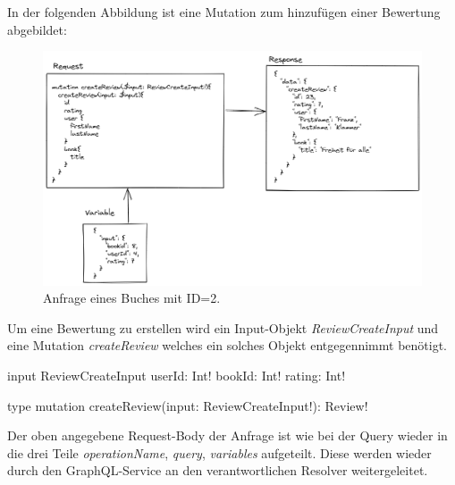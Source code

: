 In der folgenden Abbildung ist eine Mutation zum hinzufügen einer Bewertung abgebildet:

\begin{figure}[H]
    \includegraphics[width=\textwidth]{pics/createReviewMutation.png}
    \caption{Anfrage eines Buches mit ID=2.}
\end{figure}

Um eine Bewertung zu erstellen wird ein Input-Objekt \textit{ReviewCreateInput} und eine Mutation \textit{createReview} welches ein solches Objekt entgegennimmt benötigt.

\begin{JsCode}
input ReviewCreateInput {
    userId: Int!
    bookId: Int!
    rating: Int!
}

type mutation {
    createReview(input: ReviewCreateInput!): Review!
}
\end{JsCode}


Der oben angegebene Request-Body der Anfrage ist wie bei der Query wieder in die drei Teile \textit{operationName}, \textit{query}, \textit{variables} aufgeteilt.
Diese werden wieder durch den GraphQL-Service an den verantwortlichen Resolver weitergeleitet.

